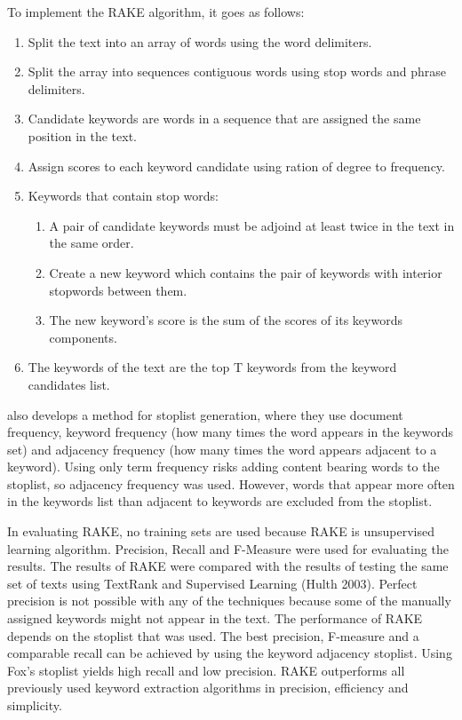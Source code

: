 \documentclass[11pt,a4paper]{article}
\begin{document}
To implement the RAKE algorithm, it goes as follows:
\begin{enumerate}
\item Split the text into an array of words using the word delimiters.
\item Split the array into sequences contiguous words using stop words and phrase delimiters.
\item Candidate keywords are words in a sequence that are assigned the same position in the text. 
\item Assign scores to each keyword candidate using ration of degree to frequency. 
\item Keywords that contain stop words:
\begin{enumerate}
\item A pair of candidate keywords must be adjoind at least twice in the text in the same order.
\item Create a new keyword which contains the pair of keywords with interior stopwords between them.
\item The new keyword’s score is the sum of the scores of its keywords components.
\end{enumerate}
\item The keywords of the text are the top T keywords from the keyword candidates list.
\end{enumerate}

\citet{1} also develops a method for stoplist generation, where they use document frequency, keyword frequency (how many times the word appears in the keywords set) and adjacency frequency (how many times the word appears adjacent to a keyword). Using only term frequency risks adding content bearing words to the stoplist, so adjacency frequency was used. However, words that appear more often in the keywords list than adjacent to keywords are excluded from the stoplist.   

In evaluating RAKE, no training sets are used because RAKE is unsupervised learning algorithm. Precision, Recall and F-Measure were used for evaluating the results. The results of RAKE were compared with the results of testing the same set of texts using TextRank and Supervised Learning (Hulth 2003). Perfect precision is not possible with any of the techniques because some of the manually assigned keywords might not appear in the text. The performance of RAKE depends on the stoplist that was used. The best precision, F-measure and a comparable recall can be achieved by using the keyword adjacency stoplist. Using Fox’s stoplist yields high recall and low precision. RAKE outperforms all previously used keyword extraction algorithms in precision, efficiency and simplicity.
\end{document}
